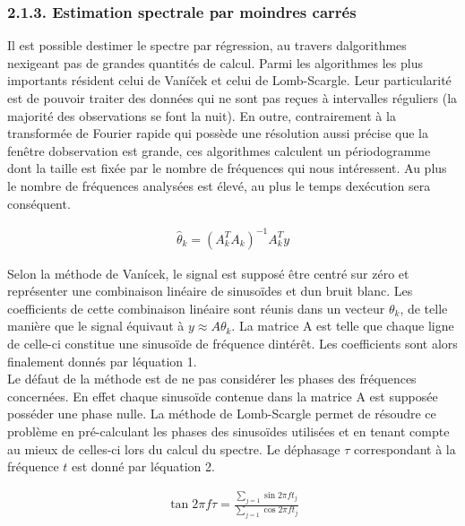 \documentclass[letterpaper]{article}
\begin{document}
\subsubsection*{2.1.3. Estimation spectrale par moindres carrés}

Il est possible d\textquotesingle estimer le spectre par régression, au travers d\textquotesingle algorithmes n\textquotesingle exigeant
pas de grandes quantités de calcul. Parmi les algorithmes les plus importants résident celui de Vaníček et celui de Lomb-Scargle. Leur particularité est
de pouvoir traiter des données qui ne sont pas reçues à intervalles réguliers (la majorité des observations se font la nuit). En outre, contrairement à la transformée de Fourier rapide qui possède une résolution aussi précise que la fenêtre d\textquotesingle observation est grande, ces algorithmes
calculent un périodogramme dont la taille est fixée par le nombre de fréquences qui nous intéressent. Au plus le nombre de fréquences analysées est
élevé, au plus le temps d\textquotesingle exécution sera conséquent.

\begin{align}
\hat{\theta}_{k} = (A_{k}^{T} A_{k})^{-1} A_{k}^{T} y
\end{align}

Selon la méthode de Vanícek, le signal est supposé être centré sur zéro et représenter une combinaison linéaire de sinusoïdes et d\textquotesingle un bruit blanc.
Les coefficients de cette combinaison linéaire sont réunis dans un vecteur $\theta_{k}$, de telle manière que le signal équivaut à $y \approx A\theta_{k}$.
La matrice A est telle que chaque ligne de celle-ci constitue une sinusoïde de fréquence d\textquotesingle intérêt. Les coefficients sont alors finalement
donnés par l\textquotesingle équation 1. \citep{PV}\\

Le défaut de la méthode est de ne pas considérer les phases des fréquences concernées. En effet chaque sinusoïde contenue dans la matrice A
est supposée posséder une phase nulle. La méthode de Lomb-Scargle permet de résoudre ce problème en pré-calculant les phases des sinusoïdes
utilisées et en tenant compte au mieux de celles-ci lors du calcul du spectre. Le déphasage $\tau$ correspondant à la fréquence $t$ est donné par
l\textquotesingle équation 2. \citep{LS}

\begin{align}
\tan 2\pi f \tau = \frac{\sum\limits_{j=1} \sin 2\pi f t_{j}}{\sum\limits_{j=1} \cos 2\pi f t_{j}}
\end{align}
\end{document}

